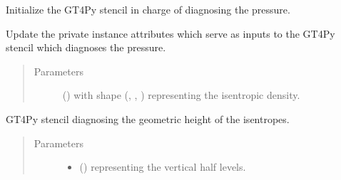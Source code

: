 \documentclass[letterpaper,10pt,english]{sphinxmanual}
\begin{document}
\begin{fulllineitems}

\begin{fulllineitems}
\label{\detokenize{api:dycore.diagnostic_isentropic.DiagnosticIsentropic._stencil_diagnosing_air_pressure_initialize}}
Initialize the GT4Py stencil in charge of diagnosing the pressure.

\end{fulllineitems}


\begin{fulllineitems}
\label{\detokenize{api:dycore.diagnostic_isentropic.DiagnosticIsentropic._stencil_diagnosing_air_pressure_set_inputs}}
Update the private instance attributes which serve as inputs to the GT4Py stencil which diagnoses the pressure.
\begin{quote}\begin{description}
\item[{Parameters}] \leavevmode
{} () \textendash{}  with shape (, , ) representing the isentropic density.

\end{description}\end{quote}

\end{fulllineitems}


\begin{fulllineitems}
\label{\detokenize{api:dycore.diagnostic_isentropic.DiagnosticIsentropic._stencil_diagnosing_height_defs}}
GT4Py stencil diagnosing the geometric height of the isentropes.
\begin{quote}\begin{description}
\item[{Parameters}] \leavevmode\begin{itemize}
\item {} 
 () \textendash{}  representing the vertical half levels.


\end{itemize}
\end{description}
\end{quote}
\end{fulllineitems}
\end{fulllineitems}
\end{document}
